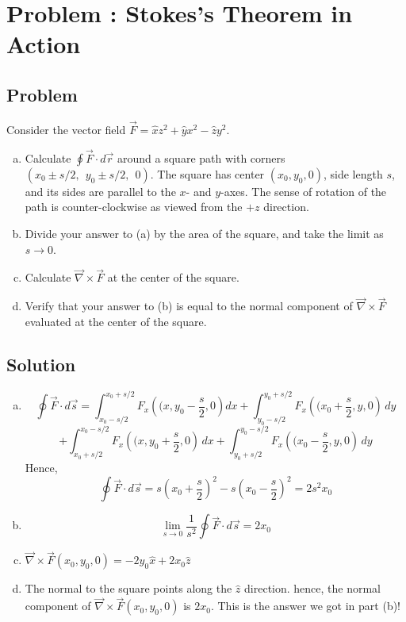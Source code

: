 \documentclass[solutions]{esg8022pset}
\begin{document}
\section{Problem \thesection: Stokes's Theorem in Action}
\subsection{Problem}
  Consider the vector field $\vec{F} = \hat{x} z^2 + \hat{y} x^2 - \hat{z} y^2$.
  \begin{enumerate}[(a)]
    \item Calculate $\oint \vec{F} \cdot d\vec{r}$ around a square path with
      corners $(x_0 \pm s/2,~~y_0 \pm s/2,~~0)$. The square has
      center $(x_0,y_0,0)$, side length $s$, and its sides are parallel to
      the $x$- and $y$-axes. The sense of rotation of the path
      is counter-clockwise as viewed from the $+z$ direction.
    \item Divide your answer to (a) by the area of the square, and take
      the limit as $s\rightarrow 0$.
    \item Calculate $\vec{\nabla}\times \vec{F}$ at the center of the square.
    \item Verify that your answer to (b) is equal to the normal component
      of $\vec{\nabla}\times\vec{F}$ evaluated at the center of the square.
  \end{enumerate}
\subsection{Solution}
  \begin{enumerate}[(a)]
    \item $$\oint \vec{F} \cdot d\vec{s} = \int_{x_0-s/2}^{x_0+s/2} F_x\left((x,y_0 -\frac{s}{2},0 \right) dx + \int_{y_0-s/2}^{y_0+s/2} F_x\left((x_0 +\frac{s}{2},y,0 \right)\,dy  $$ $$+ \int_{x_0+s/2}^{x_0-s/2} F_x\left((x,y_0 +\frac{s}{2},0 \right)\,dx +  \int_{y_0+s/2}^{y_0-s/2} F_x\left((x_0 -\frac{s}{2},y,0 \right)\,dy$$
      Hence,
      $$\oint \vec{F} \cdot d\vec{s} = s\left( x_0 + \frac{s}{2} \right)^2-s\left( x_0 - \frac{s}{2} \right)^2 = 2 s^2 x_0$$
    \item $$\lim_{s\rightarrow 0}\frac{1}{s^2}\oint \vec{F} \cdot d\vec{s} = 2 x_0$$
    \item $\vec{\nabla} \times \vec{F} (x_0,y_0,0)= -2 y_0 \hat x + 2 x_0 \hat z $
    \item The normal to the square points along the $\hat z$ direction. hence, the normal component of $\vec{\nabla} \times \vec{F} (x_0,y_0,0)$ is $2x_0$. This is the answer we got in part (b)!
  \end{enumerate}
\end{document}
